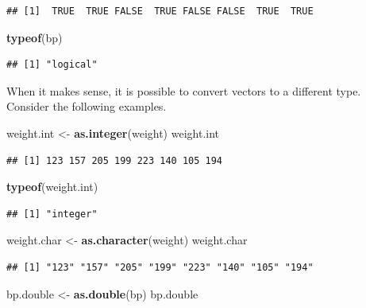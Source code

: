 \documentclass[
]{krantz}
\newenvironment{Shaded}{\begin{snugshade}}{\end{snugshade}}
\newcommand{\KeywordTok}[1]{\textcolor[rgb]{0.13,0.29,0.53}{\textbf{#1}}}
\newcommand{\NormalTok}[1]{#1}
\newcommand{\StringTok}[1]{\textcolor[rgb]{0.31,0.60,0.02}{#1}}
\begin{document}
\begin{verbatim}
## [1]  TRUE  TRUE FALSE  TRUE FALSE FALSE  TRUE  TRUE
\end{verbatim}

\begin{Shaded}
\begin{Highlighting}[]
\KeywordTok{typeof}\NormalTok{(bp)}
\end{Highlighting}
\end{Shaded}

\begin{verbatim}
## [1] "logical"
\end{verbatim}

When it makes sense, it is possible to convert vectors to a different type. Consider the following examples.

\begin{Shaded}
\begin{Highlighting}[]
\NormalTok{weight.int \textless{}{-}}\StringTok{ }\KeywordTok{as.integer}\NormalTok{(weight)}
\NormalTok{weight.int}
\end{Highlighting}
\end{Shaded}

\begin{verbatim}
## [1] 123 157 205 199 223 140 105 194
\end{verbatim}

\begin{Shaded}
\begin{Highlighting}[]
\KeywordTok{typeof}\NormalTok{(weight.int)}
\end{Highlighting}
\end{Shaded}

\begin{verbatim}
## [1] "integer"
\end{verbatim}

\begin{Shaded}
\begin{Highlighting}[]
\NormalTok{weight.char \textless{}{-}}\StringTok{ }\KeywordTok{as.character}\NormalTok{(weight)}
\NormalTok{weight.char}
\end{Highlighting}
\end{Shaded}

\begin{verbatim}
## [1] "123" "157" "205" "199" "223" "140" "105" "194"
\end{verbatim}

\begin{Shaded}
\begin{Highlighting}[]
\NormalTok{bp.double \textless{}{-}}\StringTok{ }\KeywordTok{as.double}\NormalTok{(bp)}
\NormalTok{bp.double}
\end{Highlighting}
\end{Shaded}
\end{document}
